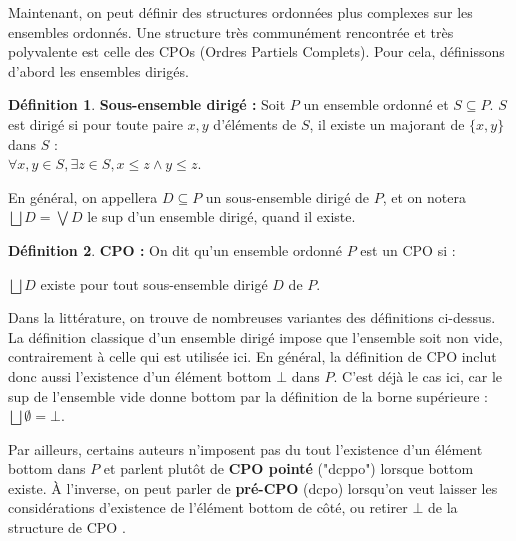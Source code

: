 \documentclass{article}
\newcommand{\yz}[1]{\textcolor{blue}{{[YZ:~#1]}}}
\theoremstyle{definition}
\newtheorem{definition}{Définition}[section]
\begin{document}
Maintenant, on peut définir des structures ordonnées plus complexes sur les ensembles ordonnés. Une structure très communément rencontrée et très polyvalente est celle des CPOs (Ordres Partiels Complets). Pour cela, définissons d'abord les ensembles dirigés.

\begin{definition}{\textbf{Sous-ensemble dirigé : }}
\label{diriges}
Soit $P$ un ensemble ordonné et $S \subseteq P$. $S$ est dirigé si pour toute paire $x,y$ d'éléments de $S$, il existe un majorant de $\{x, y\}$ dans $S$ :\\ $\forall x, y \in S, \exists z \in S, x \leq z \wedge y \leq z$.

En général, on appellera $D \subseteq P$ un sous-ensemble dirigé de $P$, et on notera $\bigsqcup D = \bigvee D$ le sup d'un ensemble dirigé, quand il existe.
\end{definition}

\begin{definition}{\textbf{CPO :}}
On dit qu'un ensemble ordonné $P$ est un CPO si :


$\bigsqcup D$ existe pour tout sous-ensemble dirigé $D$ de $P$.
\end{definition}

Dans la littérature, on trouve de nombreuses variantes des définitions
ci-dessus. La définition classique d'un ensemble dirigé impose que l'ensemble soit non vide, contrairement à celle qui est utilisée ici. En général, la définition de CPO inclut donc aussi l'existence d'un élément bottom $\bot$ dans $P$. %
C'est déjà le cas ici, car le sup de l'ensemble vide donne bottom par la définition de la borne supérieure : ~ $\bigsqcup \emptyset = \bot$.


Par ailleurs, certains auteurs n'imposent pas du tout l'existence d'un élément bottom dans $P$ et parlent plutôt de \textbf{CPO pointé} ("dcppo") lorsque bottom existe. À l'inverse, on peut parler de \textbf{pré-CPO} (dcpo) lorsqu'on veut laisser les considérations d'existence de l'élément bottom de côté, ou retirer $\bot$ de la structure de CPO \cite[page 175]{main}.%
\end{document}
